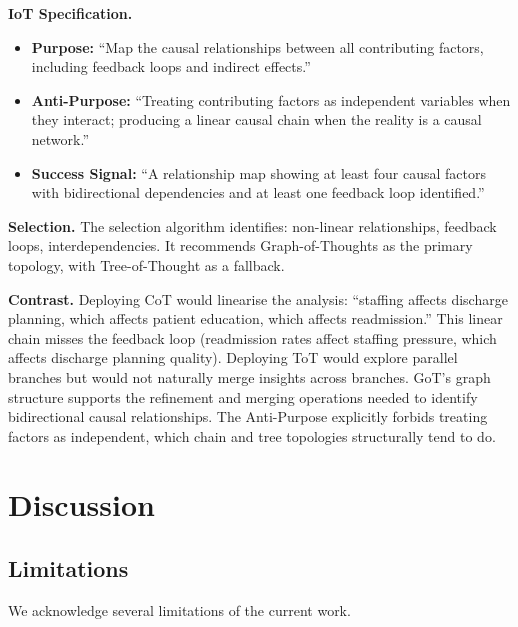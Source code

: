\documentclass[11pt,a4paper]{article}
\begin{document}
\textbf{IoT Specification.}
\begin{itemize}
  \item \textbf{Purpose:} ``Map the causal relationships between all contributing factors, including feedback loops and indirect effects.''
  \item \textbf{Anti-Purpose:} ``Treating contributing factors as independent variables when they interact; producing a linear causal chain when the reality is a causal network.''
  \item \textbf{Success Signal:} ``A relationship map showing at least four causal factors with bidirectional dependencies and at least one feedback loop identified.''
\end{itemize}

\textbf{Selection.} The selection algorithm identifies: non-linear relationships, feedback loops, interdependencies. It recommends Graph-of-Thoughts as the primary topology, with Tree-of-Thought as a fallback.

\textbf{Contrast.} Deploying CoT would linearise the analysis: ``staffing affects discharge planning, which affects patient education, which affects readmission.'' This linear chain misses the feedback loop (readmission rates affect staffing pressure, which affects discharge planning quality). Deploying ToT would explore parallel branches but would not naturally merge insights across branches. GoT's graph structure supports the refinement and merging operations needed to identify bidirectional causal relationships. The Anti-Purpose explicitly forbids treating factors as independent, which chain and tree topologies structurally tend to do.

\section{Discussion}

\subsection{Limitations}

We acknowledge several limitations of the current work.
\end{document}
